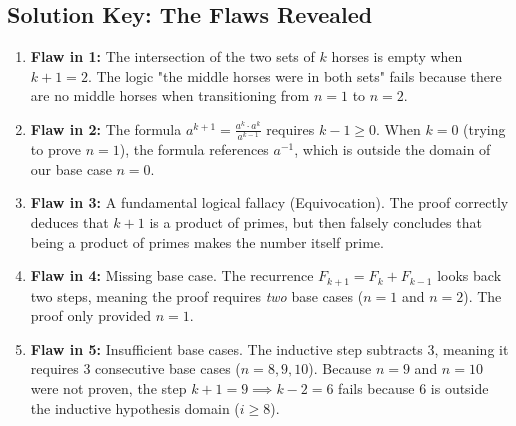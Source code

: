\documentclass[11pt, a4paper]{article}
\theoremstyle{definition}
\theoremstyle{remark}
\begin{document}
\subsection{Solution Key: The Flaws Revealed}
\begin{enumerate}
    \item \textbf{Flaw in 1:} The intersection of the two sets of $k$ horses is empty when $k+1 = 2$. The logic "the middle horses were in both sets" fails because there are no middle horses when transitioning from $n=1$ to $n=2$.
    \item \textbf{Flaw in 2:} The formula $a^{k+1} = \frac{a^k \cdot a^k}{a^{k-1}}$ requires $k-1 \ge 0$. When $k=0$ (trying to prove $n=1$), the formula references $a^{-1}$, which is outside the domain of our base case $n=0$.
    \item \textbf{Flaw in 3:} A fundamental logical fallacy (Equivocation). The proof correctly deduces that $k+1$ is a product of primes, but then falsely concludes that being a product of primes makes the number itself prime.
    \item \textbf{Flaw in 4:} Missing base case. The recurrence $F_{k+1} = F_k + F_{k-1}$ looks back two steps, meaning the proof requires \textit{two} base cases ($n=1$ and $n=2$). The proof only provided $n=1$.
    \item \textbf{Flaw in 5:} Insufficient base cases. The inductive step subtracts 3, meaning it requires 3 consecutive base cases ($n=8, 9, 10$). Because $n=9$ and $n=10$ were not proven, the step $k+1=9 \implies k-2=6$ fails because 6 is outside the inductive hypothesis domain ($i \ge 8$).
\end{enumerate}
\end{document}
